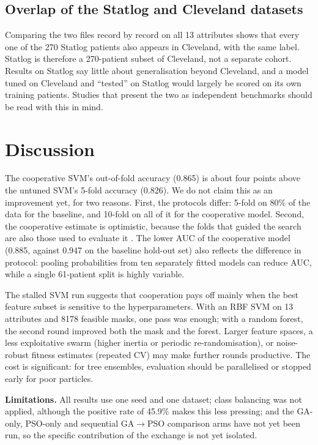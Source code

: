 \documentclass[conference]{IEEEtran}
\begin{document}
\subsection{Overlap of the Statlog and Cleveland datasets}
\label{sec:overlap}
Comparing the two files record by record on all 13 attributes shows that every one of the 270 Statlog patients also appears in Cleveland, with the same label. Statlog is therefore a 270-patient subset of Cleveland, not a separate cohort. Results on Statlog say little about generalisation beyond Cleveland, and a model tuned on Cleveland and ``tested'' on Statlog would largely be scored on its own training patients. Studies that present the two as independent benchmarks should be read with this in mind.

\section{Discussion}
\label{sec:disc}
The cooperative SVM's out-of-fold accuracy (0.865) is about four points above the untuned SVM's 5-fold accuracy (0.826). We do not claim this as an improvement yet, for two reasons. First, the protocols differ: 5-fold on 80\% of the data for the baseline, and 10-fold on all of it for the cooperative model. Second, the cooperative estimate is optimistic, because the folds that guided the search are also those used to evaluate it \cite{varma2006bias,cawley2010overfitting}. The lower AUC of the cooperative model (0.885, against 0.947 on the baseline hold-out set) also reflects the difference in protocol: pooling probabilities from ten separately fitted models can reduce AUC, while a single 61-patient split is highly variable.

The stalled SVM run suggests that cooperation pays off mainly when the best feature subset is sensitive to the hyperparameters. With an RBF SVM on 13 attributes and 8178 feasible masks, one pass was enough; with a random forest, the second round improved both the mask and the forest. Larger feature spaces, a less exploitative swarm (higher inertia or periodic re-randomisation), or noise-robust fitness estimates (repeated CV) may make further rounds productive. The cost is significant: for tree ensembles, evaluation should be parallelised or stopped early for poor particles.

\textbf{Limitations.} All results use one seed and one dataset; class balancing was not applied, although the positive rate of 45.9\% makes this less pressing; and the GA-only, PSO-only and sequential GA$\rightarrow$PSO comparison arms have not yet been run, so the specific contribution of the exchange is not yet isolated.
\end{document}
